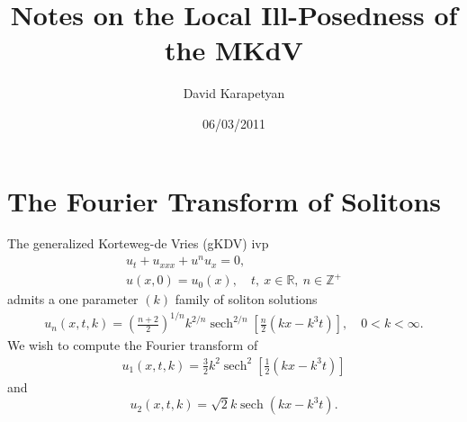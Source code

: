 \documentclass[12pt,reqno]{amsart}
\numberwithin{equation}{section}  %
\newcommand{\rr}{\mathbb{R}}
\newcommand{\zz}{\mathbb{Z}}
\DeclareMathOperator{\sech}{sech}
\begin{document}
\title{Notes on the Local Ill-Posedness of the MKdV}
\author{David Karapetyan}
\address{Department of Mathematics  \\
    University  of Notre Dame\\
        Notre Dame, IN 46556 }
        \date{06/03/2011}
        \maketitle
        \section{The Fourier Transform of Solitons}
        \label{sec:comps}

        The generalized Korteweg-de Vries (gKDV) ivp
        \begin{gather*}
          u_{t} + u_{xxx} + u^{n}u_{x} = 0, 
          \\
          u(x,0) = u_{0}(x), \quad t, \ x \in \rr, \ n \in \zz^{+}
        \end{gather*}
        admits a one parameter $(k)$ family of soliton solutions
        \begin{equation*}
        \begin{split}
          u_{n}(x,t,k) = \left( \frac{n+2}{2} \right)^{1/n} k^{2/n}
          \sech^{2/n}\left[ \frac{n}{2}(kx - k^{3}t) \right], \quad 0 < k <
          \infty.
        \end{split}
        \end{equation*}
        We wish to compute the Fourier transform of 
        \begin{equation}
          \label{kdv-soliton}
          \begin{split}
            u_{1}(x, t, k) =
        \frac{3}{2} k^{2} \sech^{2}\left[ \frac{1}{2}(kx - k^{3}t)
        \right]
      \end{split}
    \end{equation}
    and 
        \begin{equation}
          \label{mkdv-soliton}
            u_{2}(x, t, k) = \sqrt{2} k \sech\left( kx -
        k^{3}t \right).
      \end{equation}
                
\end{document}
